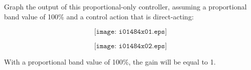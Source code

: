 

Graph the output of this proportional-only controller, assuming a proportional band value of 100\% and a control action that is direct-acting:

$$\texttt{[image: i01484x01.eps]}$$







$$\texttt{[image: i01484x02.eps]}$$







With a proportional band value of 100\%, the gain will be equal to 1.




